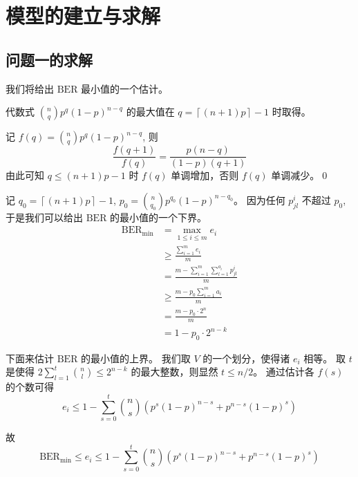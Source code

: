 \section{模型的建立与求解}

\subsection{问题一的求解}

我们将给出 \(\mathrm{BER}\) 最小值的一个估计。

\noindent{} 代数式 \(\binom{n}{q}p^q(1-p)^{n-q}\) 的最大值在 \(q=\left\lceil\left(n+1\right)p\right\rceil-1\) 时取得。

\noindent{} 记 \(f\left(q\right)=\binom{n}{q}p^q\left(1-p\right)^{n-q}\), 则
\[\frac{f\left(q+1\right)}{f\left(q\right)}=\frac{p\left(n-q\right)}{\left(1-p\right)\left(q+1\right)}\]
由此可知 \(q\le\left(n+1\right)p-1\) 时 \(f\left(q\right)\) 单调增加，否则 \(f\left(q\right)\) 单调减少。\qed

记 \(q_0=\left\lceil\left(n+1\right)p\right\rceil-1\), \(p_0=\binom{n}{q_0}p^{q_0}(1-p)^{n-q_0}\)。
因为任何 \(p^i_{jl}\) 不超过 \(p_0\), 于是我们可以给出 \(\mathrm{BER}\) 的最小值的一个下界。
\begin{align*}
  \mathrm{BER}_\mathrm{min}&=\max_{1\le i\le m}e_i\\
  &\ge\frac{\sum_{i=1}^m e_i}{m}\\
  &=\frac{m-\sum_{i=1}^m\sum_{l=1}^{a_i}p^i_{jl}}{m}\\
  &\ge\frac{m-p_0\sum_{i=1}^m a_i}{m}\\
  &=\frac{m-p_0\cdot2^n}{m}\\
  &=1-p_0\cdot 2^{n-k}
\end{align*}

下面来估计 \(\mathrm{BER}\) 的最小值的上界。
我们取 \(V\) 的一个划分，使得诸 \(e_i\) 相等。
取 \(t\) 是使得 \(2\sum_{l=1}^t\binom{n}{l}\le 2^{n-k}\) 的最大整数，则显然 \(t\le n/2\)。
通过估计各 \(f\left(s\right)\) 的个数可得
\[e_i\le 1-\sum_{s=0}^t\binom{n}{s}\left(p^s\left(1-p\right)^{n-s}+p^{n-s}\left(1-p\right)^s\right)\]

故
\[\mathrm{BER}_\mathrm{min}\le e_i\le 1-\sum_{s=0}^t\binom{n}{s}\left(p^s\left(1-p\right)^{n-s}+p^{n-s}\left(1-p\right)^s\right)\]